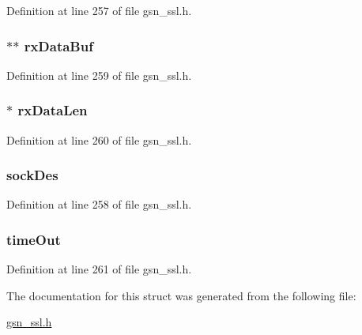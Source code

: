 Definition at line 257 of file gsn\_\-ssl.h.

\hypertarget{a00244_a6e604d1a5b870f696163260bfbcb39e3}{
\subsubsection[{rxDataBuf}]{$\ast$$\ast$ {\bf rxDataBuf}}}
\label{a00244_a6e604d1a5b870f696163260bfbcb39e3}


Definition at line 259 of file gsn\_\-ssl.h.

\hypertarget{a00244_a82a7992d64cbccb49d3c30db5b9350ab}{
\subsubsection[{rxDataLen}]{$\ast$ {\bf rxDataLen}}}
\label{a00244_a82a7992d64cbccb49d3c30db5b9350ab}


Definition at line 260 of file gsn\_\-ssl.h.

\hypertarget{a00244_a990471f388801cebd3a5b30dd1beb42e}{
\subsubsection[{sockDes}]{ {\bf sockDes}}}
\label{a00244_a990471f388801cebd3a5b30dd1beb42e}


Definition at line 258 of file gsn\_\-ssl.h.

\hypertarget{a00244_a87d41a70179b90987ab2eff426eae137}{
\subsubsection[{timeOut}]{ {\bf timeOut}}}
\label{a00244_a87d41a70179b90987ab2eff426eae137}


Definition at line 261 of file gsn\_\-ssl.h.



The documentation for this struct was generated from the following file:\begin{DoxyCompactItemize}
\item 
\hyperlink{a00590}{gsn\_\-ssl.h}\end{DoxyCompactItemize}
